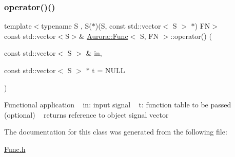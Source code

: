 \subsubsection{\texorpdfstring{operator()()}{operator()()}}
{\footnotesize\ttfamily template$<$typename S , S($\ast$)(\+S, const std\+::vector$<$ S $>$ $\ast$) FN$>$ \\
const std\+::vector$<$S$>$\& \hyperlink{class_aurora_1_1_func}{Aurora\+::\+Func}$<$ S, FN $>$\+::operator() (\begin{DoxyParamCaption}\item[{const std\+::vector$<$ S $>$ \&}]{in,  }\item[{const std\+::vector$<$ S $>$ $\ast$}]{t = {\ttfamily NULL} }\end{DoxyParamCaption})\hspace{0.3cm}{\ttfamily [inline]}}

Functional application ~\newline
in\+: input signal ~\newline
t\+: function table to be passed (optional) ~\newline
returns reference to object signal vector 

The documentation for this class was generated from the following file\+:\begin{DoxyCompactItemize}
\item 
\hyperlink{_func_8h}{Func.\+h}\end{DoxyCompactItemize}
